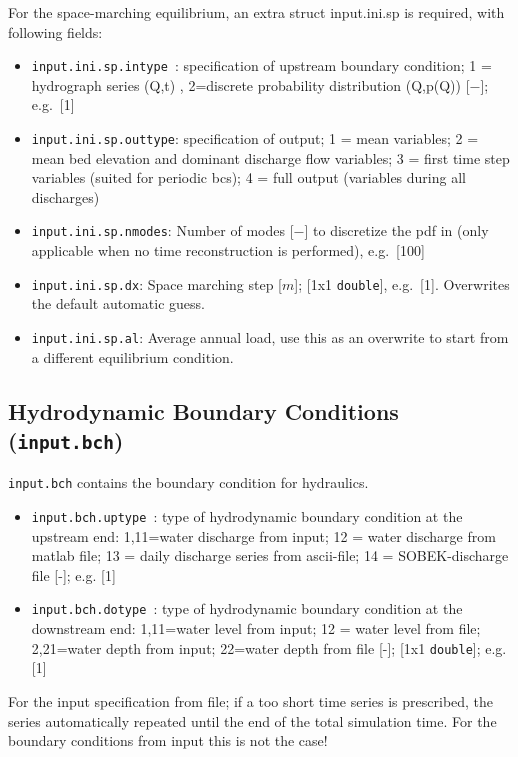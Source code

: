 \documentclass[a4paper, 11pt]{article}
\begin{document}
For the space-marching equilibrium, an extra struct input.ini.sp is required, with following fields:
\begin{itemize}
\item \texttt{input.ini.sp.intype }: specification of upstream boundary condition; 1 = hydrograph series (Q,t) , 2=discrete probability distribution (Q,p(Q)) [$-$]; e.g.\ [1]
\item \texttt{input.ini.sp.outtype}: specification of output; 1 = mean variables; 2 = mean bed elevation and dominant discharge flow variables; 3 = first time step variables (suited for periodic bcs); 4 = full output (variables during all discharges)
\item \texttt{input.ini.sp.nmodes}: Number of modes [$-$] to discretize the pdf in (only applicable when no time reconstruction is performed),   e.g.\ [100]
\item \texttt{input.ini.sp.dx}: Space marching step  [$m$]; [1x1 \texttt{double}],  e.g.\ [1]. Overwrites the default automatic guess.
\item \texttt{input.ini.sp.al}: Average annual load, use this as an overwrite to start from a different equilibrium condition.
\end{itemize}



%
\subsection{Hydrodynamic Boundary Conditions (\texttt{input.bch})}
\label{subsubsec:in_bch}
%
\texttt{input.bch} contains the boundary condition for hydraulics.
\begin{itemize}
\item \texttt{input.bch.uptype   }: type of hydrodynamic boundary condition at the upstream end: {1,11}=water discharge from input; 12 = water discharge from matlab file; 13 = daily discharge series from ascii-file; 14 = SOBEK-discharge file [-]; e.g. [1]
\item \texttt{input.bch.dotype   }: type of hydrodynamic boundary condition at the downstream end: {1,11}=water level from input; 12 = water level from file; {2,21}=water depth from input; 22=water depth from file  [-]; [1x1 \texttt{double}]; e.g. [1]\\
\end{itemize}
For the input specification from file; if a too short time series is prescribed, the series automatically repeated until the end of the total simulation time. For the boundary conditions from input this is not the case!
\end{document}
